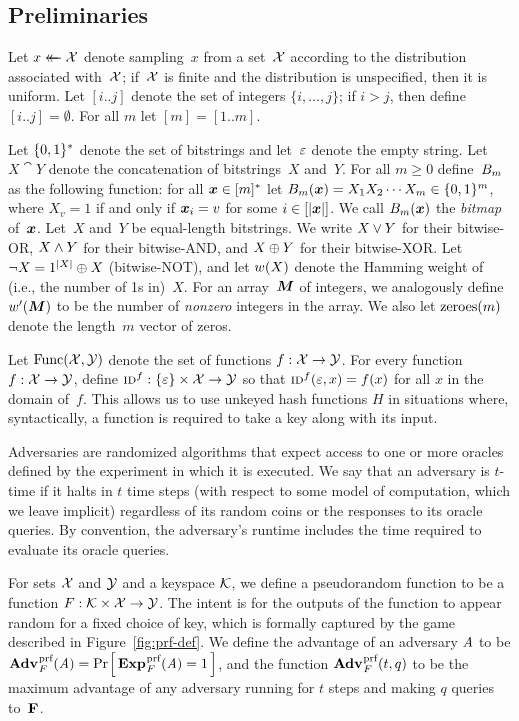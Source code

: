 \subsection{Preliminaries}
\label{sec:prelims}

Let $x \mathrel{\leftarrow\mkern-14mu\leftarrow} \mathcal{X}$ denote sampling~$x$ from a set~$\mathcal{X}$ according to the
distribution associated with~$\mathcal{X}$; if~$\mathcal{X}$ is finite and the distribution
is unspecified, then it is uniform.
%
Let $[i..j]$ denote the set of integers $\{i, \ldots, j\}$; if $i > j$, then
define $[i..j] = \emptyset$. For all $m$ let $[m] = [1..m]$.

Let $\{0,1\}^*$ denote the set of bitstrings and let~$\varepsilon$ denote the empty
string.
%
Let $X \cat Y$ denote the concatenation of bitstrings~$X$ and~$Y$.
%
For all $m\geq0$ define~${B}_m$ as the following function: for all
$\v.x\in[m]^*$ let $\bmap_m(\v.x) = X_1X_2\cdots X_m\in\bits^m$, where
$X_v=1$ if and only if $\v.x_i = v$ for some $i\in[|\v.x|]$.
%
We call $\bmap_m(\v.x)$ the \emph{bitmap} of~$\v.x$.
%
Let~$X$ and~$Y$ be equal-length bitstrings. We write $X \vee Y$ for their
bitwise-OR, $X \wedge Y$ for their bitwise-AND, and $X \mathbin{\oplus} Y$ for their
bitwise-XOR. Let $\neg X = 1^{|X|} \mathbin{\oplus} X$ (bitwise-NOT), and let ${w}(X)$ denote the Hamming
weight of (i.e., the number of 1s in)~$X$.
%
For an array~$\v.M$ of integers, we analogously define $\hw'(\v.M)$ to be the number
of \emph{nonzero} integers in the array. We also let $\mathrm{zeroes}(m)$ denote the
length~$m$ vector of zeros.

Let $\mathrm{Func}(\mathcal{X},\mathcal{Y})$ denote the set of functions $f:\mathcal{X}\to\mathcal{Y}$.
%
For every function~$f: \mathcal{X} \to \mathcal{Y}$, define $\textnormal{\textsc{id}}^f: \{\varepsilon\} \times \mathcal{X} \to \mathcal{Y}$ so that
$\textnormal{\textsc{id}}^f(\varepsilon, x) = f(x)$ for all $x$ in the domain
of~$f$. This allows us to use unkeyed hash functions $H$ in situations where,
syntactically, a function is required to take a key along with its input.

Adversaries are randomized algorithms that expect access to one or more oracles
defined by the experiment in which it is executed. We say that an adversary is
$t$-time if it halts in $t$ time steps (with respect to some model of
computation, which we leave implicit) regardless of its random coins or the
responses to its oracle queries. By convention, the adversary's runtime includes
the time required to evaluate its oracle queries.

%
For sets $\mathcal{X}$ and $\mathcal{Y}$ and a keyspace $\mathcal{K}$, we define a pseudorandom
function to be a function $F: \mathcal{K} \times \mathcal{X} \to \mathcal{Y}$. The intent is for
the outputs of the function to appear random for a fixed choice of key, which is
formally captured by the game described in Figure~\ref{fig:prf-def}. We define
the advantage of an adversary $\mathit{A}$ to be
$\Adv{\prf}_F(\advA) = \Prob{\Exp{\prf}_F(\advA) = 1}$, and the function
$\Adv{\prf}_F(t,q)$ to be the maximum advantage of any adversary running for $t$
steps and making $q$ queries to~$\textup{\textbf{F}}\hspace{0.5pt}$.

